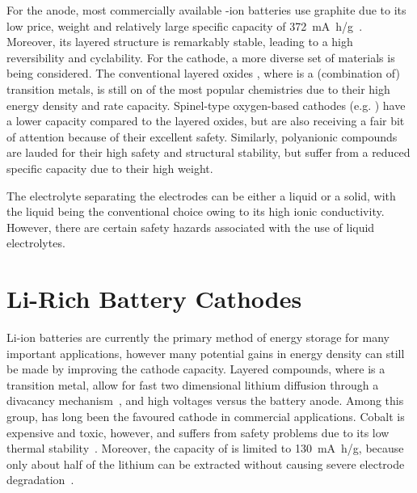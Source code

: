 \begin{refsection}

For the anode, most commercially available -ion batteries use graphite due to its low price, weight and relatively large specific capacity of 372~\si{\milli\ampere\hour/\gram}~\cite{Mao2018}. Moreover, its layered structure is remarkably stable, leading to  a high reversibility and cyclability. For the cathode, a more diverse set of materials is being considered. The conventional layered oxides , where  is a (combination of) transition metals, is still on of the most popular chemistries due to their high energy density and rate capacity. Spinel-type oxygen-based cathodes (e.g. ) have a lower capacity compared to the layered oxides, but are also receiving a fair bit of attention because of their excellent safety. Similarly, polyanionic compounds are lauded for their high safety and structural stability, but suffer from a reduced specific capacity due to their high weight.

The electrolyte separating the electrodes can be either a liquid or a solid, with the liquid being the conventional choice owing to its high ionic conductivity. However, there are certain safety hazards associated with the use of liquid electrolytes. 



\section{Li-Rich Battery Cathodes} \label{batteries:sec-lirich}

Li-ion batteries are currently the primary method of energy storage for many important applications, however many potential gains in energy density can still be made by improving the cathode capacity. Layered  compounds, where  is a transition metal, allow for fast two dimensional lithium diffusion through a divacancy mechanism~\cite{VanderVen2001}, and high voltages versus the battery anode. Among this group,  has long been the favoured cathode in commercial applications. Cobalt is expensive and toxic, however, and suffers from safety problems due to its low thermal stability~\cite{Larcher2015}. Moreover, the capacity of  is limited to 130~\si{\milli\ampere\hour/\gram}, because only about half of the lithium can be extracted without causing severe electrode degradation~\cite{Rozier2015}.


\end{refsection}
